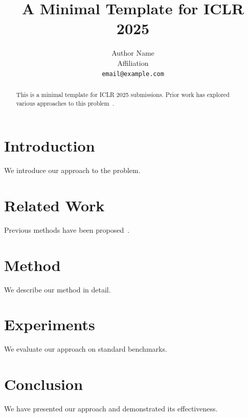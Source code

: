 \documentclass{article}
\title{A Minimal Template for ICLR 2025}
\author{
  Author Name \\
  Affiliation \\
  \texttt{email@example.com}
}
\begin{document}
\maketitle

\begin{abstract}
This is a minimal template for ICLR 2025 submissions.
Prior work has explored various approaches to this problem~\citep{example2024}.
\end{abstract}

\section{Introduction}
We introduce our approach to the problem.

\section{Related Work}
Previous methods have been proposed~\citep{example2024}.

\section{Method}
We describe our method in detail.

\section{Experiments}
We evaluate our approach on standard benchmarks.

\section{Conclusion}
We have presented our approach and demonstrated its effectiveness.



\end{document}
